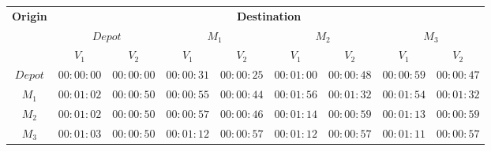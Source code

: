 \documentclass[a4paper,12pt]{article}
\begin{document}
  \begin{center}
    \begin{tabular}{|c|c|c|c|c|c|c|c|c|} 
    \hline
     \multirow{3}{*}{\bf{Origin}}	& \multicolumn{8}{c|}{\bf{Destination}}\\ \cline{2-9}
	& \multicolumn{2}{c|}{$Depot$}	& \multicolumn{2}{c|}{$M_1$}	& \multicolumn{2}{c|}{$M_2$}		& \multicolumn{2}{c|}{$M_3$}\\ \cline{2-9}
    	 	& $V_1$ & $V_2$	& $V_1$ & $V_2$ & $V_1$ & $V_2$ & $V_1$ & $V_2$\\ \hline
    {\bf $Depot$}	& $00:00:00$	& $00:00:00$		& $00:00:31$ & $00:00:25$		& $00:01:00$ & $00:00:48$		& $00:00:59$	& $00:00:47$\\
    {\bf $M_1$}		& $00:01:02$	& $00:00:50$		& $00:00:55$ & $00:00:44$		& $00:01:56$ & $00:01:32$		& $00:01:54$	& $00:01:32$\\
    {\bf $M_2$}		& $00:01:02$	& $00:00:50$		& $00:00:57$ & $00:00:46$		& $00:01:14$ & $00:00:59$		& $00:01:13$	& $00:00:59$\\
    {\bf $M_3$}		& $00:01:03$	& $00:00:50$		& $00:01:12$ & $00:00:57$		& $00:01:12$ & $00:00:57$		& $00:01:11$	& $00:00:57$\\
    \hline
    \end{tabular}

  \end{center}
\end{document}
